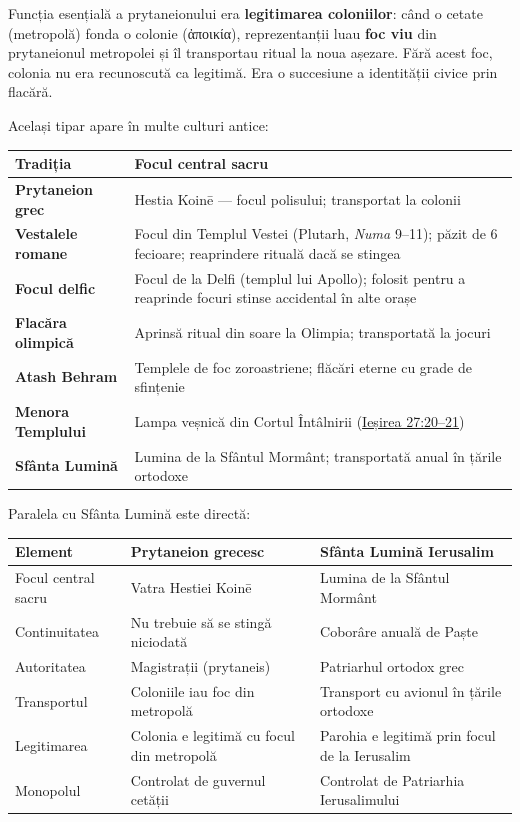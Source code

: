\documentclass[12pt,a4paper,twoside,openany]{book}
\begin{document}
Funcția esențială a prytaneionului era \textbf{legitimarea coloniilor}: când o cetate (metropolă) fonda o colonie (ἀποικία), reprezentanții luau \textbf{foc viu} din prytaneionul metropolei și îl transportau ritual la noua așezare. Fără acest foc, colonia nu era recunoscută ca legitimă. Era o succesiune a identității civice prin flacără.

Același tipar apare în multe culturi antice:

\begin{center}
\small
\begin{tabularx}{\textwidth}{L{3.5cm}X}
\toprule
{}
\textbf{Tradiția} & \textbf{Focul central sacru} \\
\midrule
\textbf{Prytaneion grec} & Hestia Koinē --- focul polisului; transportat la colonii \\
\textbf{Vestalele romane} & Focul din Templul Vestei (Plutarh, \textit{Numa} 9--11); păzit de 6 fecioare; reaprindere rituală dacă se stingea \\
\textbf{Focul delfic} & Focul de la Delfi (templul lui Apollo); folosit pentru a reaprinde focuri stinse accidental în alte orașe \\
\textbf{Flacăra olimpică} & Aprinsă ritual din soare la Olimpia; transportată la jocuri \\
\textbf{Atash Behram} & Templele de foc zoroastriene; flăcări eterne cu grade de sfințenie \\
\textbf{Menora Templului} & Lampa veșnică din Cortul Întâlnirii (\href{https://bibliaortodoxa.ro/carte.php?id=32\&cap=27\#20}{Ieșirea 27:20--21}) \\
\textbf{Sfânta Lumină} & Lumina de la Sfântul Mormânt; transportată anual în țările ortodoxe \\
\bottomrule
\end{tabularx}
\end{center}

Paralela cu Sfânta Lumină este directă:

\begin{center}
\small
\begin{tabularx}{\textwidth}{L{4.2cm}L{4.4cm}X}
\toprule
{}
\textbf{Element} & \textbf{Prytaneion grecesc} & \textbf{Sfânta Lumină Ierusalim} \\
\midrule
Focul central sacru & Vatra Hestiei Koinē & Lumina de la Sfântul Mormânt \\
Continuitatea & Nu trebuie să se stingă niciodată & Coborâre anuală de Paște \\
Autoritatea & Magistrații (prytaneis) & Patriarhul ortodox grec \\
Transportul & Coloniile iau foc din metropolă & Transport cu avionul în țările ortodoxe \\
Legitimarea & Colonia e legitimă cu focul din metropolă & Parohia e legitimă prin focul de la Ierusalim \\
Monopolul & Controlat de guvernul cetății & Controlat de Patriarhia Ierusalimului \\
\bottomrule
\end{tabularx}
\end{center}
\end{document}

